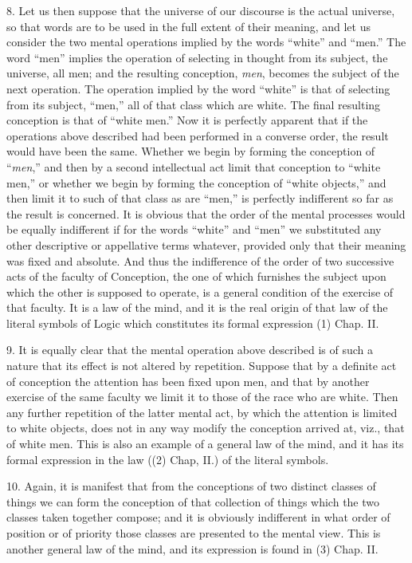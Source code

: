 \documentclass[oneside]{book}
\begin{document}
8. Let us then suppose that the universe of our discourse is
the actual universe, so that words are to be used in the full extent
of their meaning, and let us consider the two mental operations
implied by the words ``white'' and ``men.'' The word
``men'' implies the operation of selecting in thought from its
subject, the universe, all men; and the resulting conception,
\textit{men}, becomes the subject of the next operation. The operation
implied by the word ``white'' is that of selecting from its subject,
``men,'' all of that class which are white. The final resulting
conception is that of ``white men.'' Now it is perfectly apparent
that if the operations above described had been performed
in a converse order, the result would have been the same. Whether
we begin by forming the conception of ``\textit{men},'' and then
by a second intellectual act limit that conception to ``white
men,'' or whether we begin by forming the conception of ``white
objects,'' and then limit it to such of that class as are ``men,'' is
perfectly indifferent so far as the result is concerned. It is obvious
that the order of the mental processes would be equally
indifferent if for the words ``white'' and ``men'' we substituted
any other descriptive or appellative terms whatever, provided
only that their meaning was fixed and absolute. And thus the
indifference of the order of two successive acts of the faculty of
Conception, the one of which furnishes the subject upon which
the other is supposed to operate, is a general condition of the
exercise of that faculty. It is a law of the mind, and it is the
real origin of that law of the literal symbols of Logic which constitutes
its formal expression (1) Chap. II.

9. It is equally clear that the mental operation above described
is of such a nature that its effect is not altered by repetition.
Suppose that by a definite act of conception the attention
has been fixed upon men, and that by another exercise of the
same faculty we limit it to those of the race who are white.
Then any further repetition of the latter mental act, by which
the attention is limited to white objects, does not in any way
modify the conception arrived at, viz., that of white men. This
is also an example of a general law of the mind, and it has its
formal expression in the law ((2) Chap, II.) of the literal symbols.

10. Again, it is manifest that from the conceptions of two
distinct classes of things we can form the conception of that collection
of things which the two classes taken together compose;
and it is obviously indifferent in what order of position or of
priority those classes are presented to the mental view. This is
another general law of the mind, and its expression is found in
(3) Chap. II.
\end{document}
